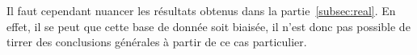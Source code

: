 
Il faut cependant nuancer les résultats obtenus dans la partie\ \ref{subsec:real}.
En effet, il se peut que cette base de donnée soit biaisée,
il n'est donc pas possible de tirrer des conclusions générales à partir de ce cas particulier.
